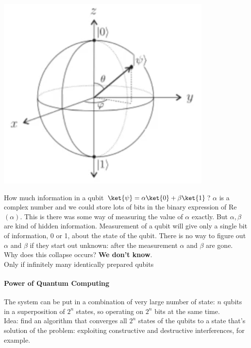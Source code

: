 \documentclass[10pt]{report}
\begin{document}
\begin{center}
	\includegraphics[scale=0.5]{5.png}
\end{center}
How much information in a qubit $\ket{\psi} = \alpha\ket{0} + \beta\ket{1}$? $\alpha$ is a complex number and we could store lots of bits in the binary expression of Re$(\alpha)$. This is there was some way of measuring the value of $\alpha$ exactly. But $\alpha,\beta$ are kind of hidden information. Measurement of a qubit will give only a single bit of information, 0 or 1, about the state of the qubit. There is no way to figure out $\alpha$ and $\beta$ if they start out unknown: after the measurement $\alpha$ and $\beta$ are gone.\\
Why does this collapse occurs? \textbf{We don't know}.\\
Only if infinitely many identically prepared qubits %
\paragraph{Power of Quantum Computing} The system can be put in a combination of very large number of state: $n$ qubits in a superposition of $2^n$ states, so operating on $2^n$ bits at the same time.\\
Idea: find an algorithm that converges all $2^n$ states of the qubits to a state that's solution of the problem: exploiting constructive and destructive interferences, for example.
\end{document}
